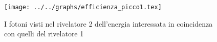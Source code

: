 \begin{figure}[h] \centering\texttt{[image: ../../graphs/efficienza\_picco1.tex]}\caption{I fotoni visti nel rivelatore 2 dell'energia interessata in coincidenza con quelli del rivelatore 1 }\label{gr:efficienza_picco1} \end{figure}
